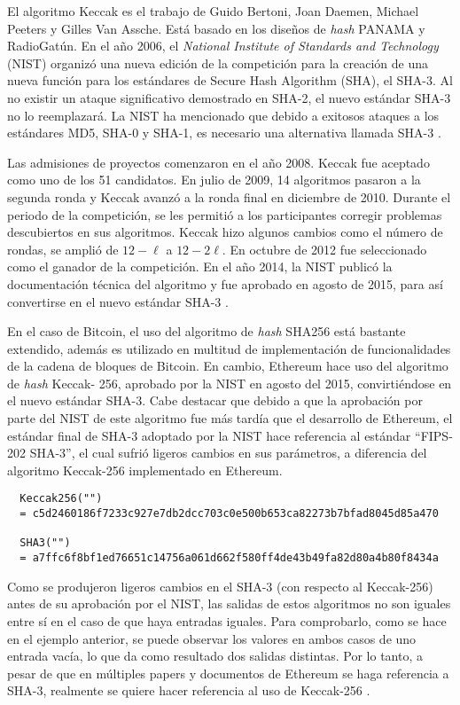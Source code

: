     El algoritmo Keccak es el trabajo de Guido Bertoni, Joan Daemen, Michael Peeters y Gilles Van Assche. Está basado en los diseños de 
    \textit{hash} PANAMA y RadioGatún. En el año 2006, el \textit{National Institute of Standards and Technology} (NIST) organizó una nueva edición de la competición para la creación de una nueva función 
    para los estándares de Secure Hash Algorithm (SHA), el SHA-3. Al no existir un ataque significativo demostrado en SHA-2, el nuevo 
    estándar SHA-3 no lo reemplazará. La NIST ha mencionado que debido a exitosos ataques a los estándares MD5, SHA-0 y SHA-1, es 
    necesario una alternativa llamada SHA-3 \parencite{stevens2017}.

    Las admisiones de proyectos comenzaron en el año 2008. Keccak fue aceptado como uno de los 51 candidatos. En julio de 2009, 14 
    algoritmos pasaron a la segunda ronda y Keccak avanzó a la ronda final en diciembre de 2010. Durante el periodo de la competición, se 
    les permitió a los participantes corregir problemas descubiertos en sus algoritmos. Keccak hizo algunos cambios como el número de 
    rondas, se amplió de ${\displaystyle 12-\ell}$ a ${\displaystyle 12-2\ell }$. En 
    octubre de 2012 fue seleccionado como el ganador de la competición. En el año 2014, la NIST publicó la documentación técnica del 
    algoritmo y fue aprobado en agosto de 2015, para así convertirse en el nuevo estándar SHA-3 \parencite{nist2015}.

    En el caso de Bitcoin, el uso del algoritmo de \textit{hash} SHA256 está bastante extendido,
    además es utilizado en multitud de implementación de funcionalidades de la cadena
    de bloques de Bitcoin. En cambio, Ethereum hace uso del algoritmo de \textit{hash} Keccak-
    256, aprobado por la NIST en agosto del 2015, convirtiéndose en el nuevo estándar
    SHA-3.
    Cabe destacar que debido a que la aprobación por parte del NIST de este algoritmo fue más tardía que el desarrollo de Ethereum, el 
    estándar final de SHA-3 adoptado por la NIST hace referencia al estándar “FIPS-202 SHA-3”, el cual sufrió ligeros cambios en sus parámetros, a diferencia del algoritmo Keccak-256 implementado en Ethereum.

    \begin{verbatim}
  Keccak256("")
  = c5d2460186f7233c927e7db2dcc703c0e500b653ca82273b7bfad8045d85a470

  SHA3("")
  = a7ffc6f8bf1ed76651c14756a061d662f580ff4de43b49fa82d80a4b80f8434a
    \end{verbatim}

    Como se produjeron ligeros cambios en el SHA-3 (con respecto al Keccak-256) antes de su aprobación por el NIST, las salidas de estos algoritmos no son iguales entre sí en el caso de que haya entradas iguales. Para comprobarlo, como se hace en el ejemplo anterior, se puede observar los valores en ambos casos de uno entrada vacía, lo que da como resultado dos salidas distintas. Por lo tanto, a pesar de que en múltiples papers y documentos de Ethereum se haga referencia a SHA-3, realmente se quiere hacer referencia al uso de Keccak-256 \parencite{taibo2022}.


